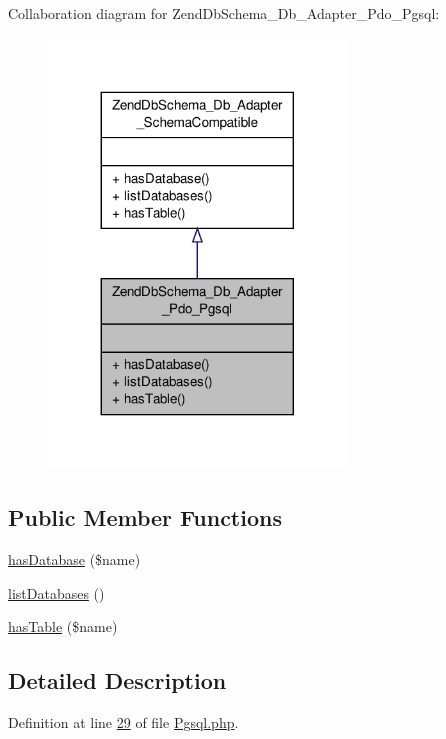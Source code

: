 Collaboration diagram for Zend\-Db\-Schema\-\_\-\-Db\-\_\-\-Adapter\-\_\-\-Pdo\-\_\-\-Pgsql\-:\nopagebreak
\begin{figure}[H]
\begin{center}
\leavevmode
\includegraphics[width=224pt]{classZendDbSchema__Db__Adapter__Pdo__Pgsql__coll__graph}
\end{center}
\end{figure}
\subsection*{Public Member Functions}
\begin{DoxyCompactItemize}
\item 
\hyperlink{classZendDbSchema__Db__Adapter__Pdo__Pgsql_a6d3d4f9e4f41395ede2f6e8bcc12b553}{has\-Database} (\$name)
\item 
\hyperlink{classZendDbSchema__Db__Adapter__Pdo__Pgsql_a869a9fd424bcb256dd16682c4b549ece}{list\-Databases} ()
\item 
\hyperlink{classZendDbSchema__Db__Adapter__Pdo__Pgsql_a48c54011ecf9401c8682838453b65128}{has\-Table} (\$name)
\end{DoxyCompactItemize}


\subsection{Detailed Description}


Definition at line \hyperlink{Pgsql_8php_source_l00029}{29} of file \hyperlink{Pgsql_8php_source}{Pgsql.\-php}.



